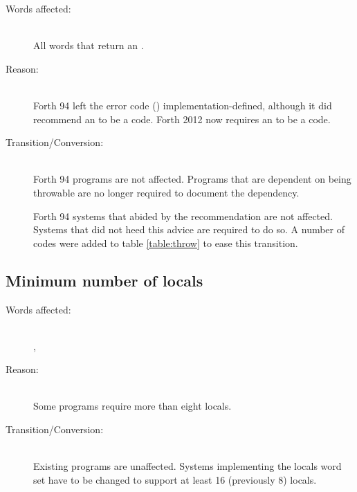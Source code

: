 \begin{description}
\item[Words affected:] ~\\
	All words that return an .

\item[Reason:] ~\\
	Forth 94 left the error code () implementation-defined,
	although it did recommend an  to be a 
	code.  Forth 2012 now requires an  to be a
	 code.

\item[Transition/Conversion:] ~\\
	Forth 94 programs are not affected.  Programs that are dependent
	on  being throwable are no longer required to document
	the dependency.

	Forth 94 systems that abided by the recommendation are not affected.
	Systems that did not heed this advice are required to do so. A
	number of  codes were added to table
	\ref{table:throw} to ease this transition.
\end{description}


\subsection{Minimum number of locals} %
\label{diff:12:locals}

\begin{description}
\item[Words affected:] ~\\
	, 

\item[Reason:] ~\\
	Some programs require more than eight locals.
 
\item[Transition/Conversion:] ~\\
	Existing programs are unaffected.  Systems implementing the locals
	word set have to be changed to support at least 16 (previously 8)
	locals.
\end{description}


